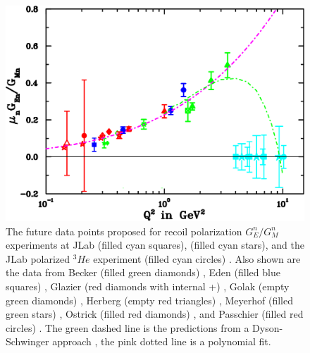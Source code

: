 \documentclass[twocolumn,epjc3]{svjour3}
\begin{document}
\begin{figure}
  \centering
  \includegraphics[width=1.00\columnwidth]{fig02_gengmn.pdf}
  \caption{The future data points proposed for recoil polarization $G^n_{E}/G^n_{M}$ experiments at JLab \cite{PR12-11-009} (filled cyan squares), \cite{PR12-17-004} (filled cyan stars), and the JLab polarized $^3\!He$ experiment (filled cyan circles) \cite{PR12-09-016}.  Also shown are the data from Becker (filled green diamonds) \cite{Becker:1999tw}, Eden (filled blue squares) \cite{Eden:1994ji}, Glazier (red diamonds with internal +) \cite{Glazier:2004ny}, Golak (empty green diamonds) \cite{Golak:2000nt}, Herberg (empty red triangles) \cite{Herberg:1999ud}, Meyerhof (filled green stars) \cite{Meyerhoff:1994ev}, Ostrick (filled red diamonds) \cite{Ostrick:1999xa}, and Passchier (filled red circles) \cite{Passchier:1999ju}. The green dashed line is the predictions from a Dyson-Schwinger approach \cite{Roberts:1994dr}, the pink dotted line is a polynomial fit.}
  \label{fig:Gen}
\end{figure}
\end{document}
